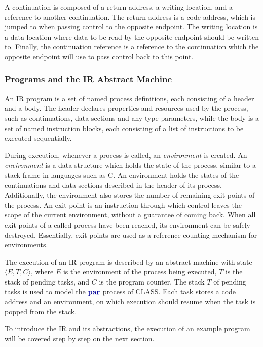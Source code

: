 \documentclass[sigconf,nonacm,natbib=true]{acmart}
\begin{document}
A continuation is composed of a return address, a writing location, and a reference to another continuation. The return address is a code address, which is jumped to when passing control to the opposite endpoint. The writing location is a data location where data to be read by the opposite endpoint should be written to. Finally, the continuation reference is a reference to the continuation which the opposite endpoint will use to pass control back to this point.

\subsubsection{Programs and the IR Abstract Machine}

An \ac{IR} program is a set of named process definitions, each consisting of a header and a body. The header declares properties and resources used by the process, such as continuations, data sections and any type parameters, while the body is a set of named instruction blocks, each consisting of a list of instructions to be executed sequentially.

During execution, whenever a process is called, an \textit{environment} is created. An \textit{environment} is a data structure which holds the state of the process, similar to a stack frame in languages such as C. An environment holds the states of the continuations and data sections described in the header of its process. Additionally, the environment also stores the number of remaining exit points of the process. An exit point is an instruction through which control leaves the scope of the current environment, without a guarantee of coming back. When all exit points of a called process have been reached, its environment can be safely destroyed. Essentially, exit points are used as a reference counting mechanism for environments.

The execution of an \ac{IR} program is described by an abstract machine with state $\langle E, T, C \rangle$, where $E$ is the environment of the process being executed, $T$ is the stack of pending tasks, and $C$ is the program counter. The stack $T$ of pending tasks is used to model the $\parp$ process of \ac{CLASS}. Each task stores a code address and an environment, on which execution should resume when the task is popped from the stack.

To introduce the \ac{IR} and its abstractions, the execution of an example program will be covered step by step on the next section.
\end{document}
